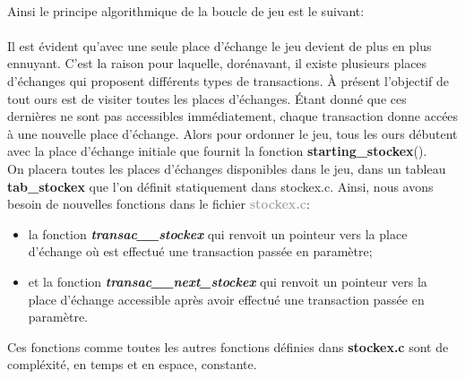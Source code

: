 \documentclass[a4paper,12pt]{article}
\begin{document}
\paragraph{}
Ainsi le principe algorithmique de la boucle de jeu est le suivant:\\


\paragraph{}
Il est évident qu'avec une seule place d'échange le jeu devient de plus en plus ennuyant. C'est la raison pour laquelle, dorénavant, il existe plusieurs places d'échanges qui proposent différents types de transactions. À présent l'objectif de tout ours est de visiter toutes les places d'échanges. Étant donné que ces dernières ne sont pas accessibles immédiatement, chaque transaction donne accées à une nouvelle place d'échange. Alors pour ordonner le jeu, tous les ours débutent avec la place d'échange initiale que fournit la fonction \textbf{starting\_stockex}().\\
On placera toutes les places d'échanges disponibles dans le jeu, dans un tableau \textbf{tab\_stockex} que l'on définit statiquement dans stockex.c. Ainsi, nous avons besoin de nouvelles fonctions dans le fichier \textcolor{darkgray}{\textbf{stockex.c}}:
\newline
\begin{itemize}
\item la fonction \emph{\textbf{transac\_\_stockex}} qui renvoit un pointeur vers la place d'échange où est effectué une transaction passée en paramètre;
\item et la fonction \emph{\textbf{transac\_\_next\_stockex}} qui renvoit un pointeur vers la place d'échange accessible après avoir effectué une transaction passée en paramètre.
\newline
\end{itemize}
Ces fonctions comme toutes les autres fonctions définies dans \textbf{stockex.c} sont de compléxité, en temps et en espace, constante. 
\end{document}
